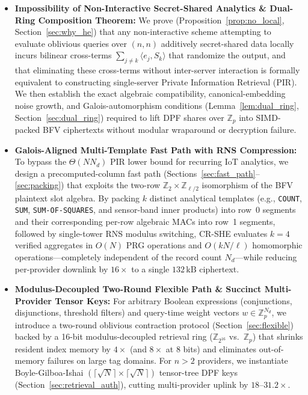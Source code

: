 \documentclass[11pt,a4paper]{article}
\begin{document}
\begin{itemize}\setlength{\itemsep}{4pt}\setlength{\parskip}{0pt}
    \item \textbf{Impossibility of Non-Interactive Secret-Shared Analytics \& Dual-Ring Composition Theorem:} We prove (Proposition~\ref{prop:no_local}, Section~\ref{sec:why_he}) that any non-interactive scheme attempting to evaluate oblivious queries over $(n,n)$ additively secret-shared data locally incurs bilinear cross-terms $\sum_{j \neq k}\langle e_j, S_k\rangle$ that randomize the output, and that eliminating these cross-terms without inter-server interaction is formally equivalent to constructing single-server Private Information Retrieval (PIR). We then establish the exact algebraic compatibility, canonical-embedding noise growth, and Galois-automorphism conditions (Lemma~\ref{lem:dual_ring}, Section~\ref{sec:dual_ring}) required to lift DPF shares over $\mathbb{Z}_p$ into SIMD-packed BFV ciphertexts without modular wraparound or decryption failure.
    \item \textbf{Galois-Aligned Multi-Template Fast Path with RNS Compression:} To bypass the $\Theta(N N_d)$ PIR lower bound for recurring IoT analytics, we design a precomputed-column fast path (Sections~\ref{sec:fast_path}--\ref{sec:packing}) that exploits the two-row $\mathbb{Z}_2 \times \mathbb{Z}_{\ell/2}$ isomorphism of the BFV plaintext slot algebra. By packing $k$ distinct analytical templates (e.g., \texttt{COUNT}, \texttt{SUM}, \texttt{SUM-OF-SQUARES}, and sensor-band inner products) into row~0 segments and their corresponding per-row algebraic MACs into row~1 segments, followed by single-tower RNS modulus switching, CR-SHE evaluates $k = 4$ verified aggregates in $O(N)$ PRG operations and $O(kN/\ell)$ homomorphic operations---completely independent of the record count $N_d$---while reducing per-provider downlink by $16\times$ to a single $132\,\text{kB}$ ciphertext.
    \item \textbf{Modulus-Decoupled Two-Round Flexible Path \& Succinct Multi-Provider Tensor Keys:} For arbitrary Boolean expressions (conjunctions, disjunctions, threshold filters) and query-time weight vectors $w \in \mathbb{Z}_p^{N_d}$, we introduce a two-round oblivious contraction protocol (Section~\ref{sec:flexible}) backed by a 16-bit modulus-decoupled retrieval ring ($\mathbb{Z}_{2^{16}}$ vs.\ $\mathbb{Z}_p$) that shrinks resident index memory by $4\times$ (and $8\times$ at 8 bits) and eliminates out-of-memory failures on large tag domains. For $n > 2$ providers, we instantiate Boyle-Gilboa-Ishai $(\lceil\sqrt{N}\rceil \times \lceil\sqrt{N}\rceil)$ tensor-tree DPF keys (Section~\ref{sec:retrieval_auth}), cutting multi-provider uplink by $18\text{--}31.2\times$.

\end{itemize}
\end{document}
